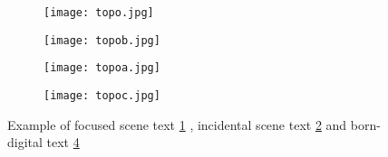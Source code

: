\begin{figure}

	\begin{subfigure}[b]{0.3\textwidth}
	 	\texttt{[image: topo.jpg]} \caption{}\label{fig:focused} \end{subfigure}
	\begin{subfigure}[b]{0.3\textwidth}
		\texttt{[image: topob.jpg]} \caption{}\label{fig:incidental} \end{subfigure}
		
		
	\begin{subfigure}[b]{0.3\textwidth}
		\texttt{[image: topoa.jpg]} \caption{}\label{fig:bornDigital} \end{subfigure}
	\begin{subfigure}[b]{0.3\textwidth}
		\texttt{[image: topoc.jpg]} \caption{}\label{fig:bornDigital} \end{subfigure}
	\centering
	\caption[Example of \textit{text}] {Example of focused scene text \ref{fig:focused} , incidental scene text \ref{fig:incidental} and born-digital text \ref{fig:bornDigital} }
	\label{fig:example}
\end{figure}


